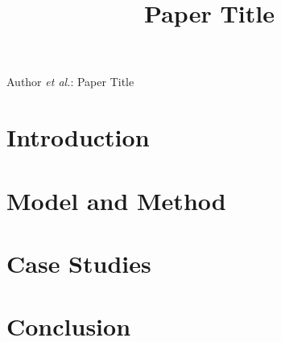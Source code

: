 \documentclass[letterpaper,10pt,journal]{IEEEtran}
\title{Paper Title}
\author{}
\begin{document}
%
{Author \MakeLowercase{\textit{et al.}}: Paper Title}
\maketitle

\begin{abstract}
\end{abstract}

\begin{IEEEkeywords}
\end{IEEEkeywords}

\section{Introduction}

\section{Model and Method}

\section{Case Studies}

\section{Conclusion}


% 
\end{document}
